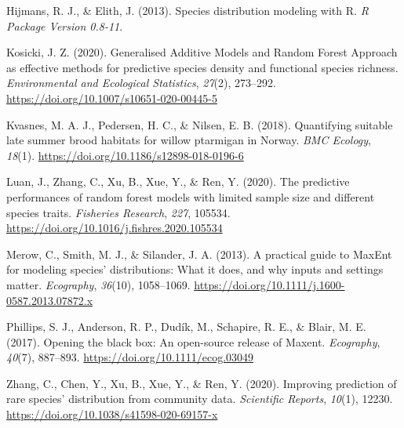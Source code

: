 \documentclass[
]{article}
\begin{document}
\leavevmode\hypertarget{ref-hijmansSpeciesDistributionModeling2013}{}%
Hijmans, R. J., \& Elith, J. (2013). Species distribution modeling with R. \emph{R Package Version 0.8-11}.

\leavevmode\hypertarget{ref-kosickiGeneralisedAdditiveModels2020}{}%
Kosicki, J. Z. (2020). Generalised Additive Models and Random Forest Approach as effective methods for predictive species density and functional species richness. \emph{Environmental and Ecological Statistics}, \emph{27}(2), 273--292. \url{https://doi.org/10.1007/s10651-020-00445-5}

\leavevmode\hypertarget{ref-kvasnesQuantifyingSuitableLate2018}{}%
Kvasnes, M. A. J., Pedersen, H. C., \& Nilsen, E. B. (2018). Quantifying suitable late summer brood habitats for willow ptarmigan in Norway. \emph{BMC Ecology}, \emph{18}(1). \url{https://doi.org/10.1186/s12898-018-0196-6}

\leavevmode\hypertarget{ref-luanPredictivePerformancesRandom2020}{}%
Luan, J., Zhang, C., Xu, B., Xue, Y., \& Ren, Y. (2020). The predictive performances of random forest models with limited sample size and different species traits. \emph{Fisheries Research}, \emph{227}, 105534. \url{https://doi.org/10.1016/j.fishres.2020.105534}

\leavevmode\hypertarget{ref-merowPracticalGuideMaxEnt2013}{}%
Merow, C., Smith, M. J., \& Silander, J. A. (2013). A practical guide to MaxEnt for modeling species' distributions: What it does, and why inputs and settings matter. \emph{Ecography}, \emph{36}(10), 1058--1069. \url{https://doi.org/10.1111/j.1600-0587.2013.07872.x}

\leavevmode\hypertarget{ref-phillipsOpeningBlackBox2017}{}%
Phillips, S. J., Anderson, R. P., Dudík, M., Schapire, R. E., \& Blair, M. E. (2017). Opening the black box: An open-source release of Maxent. \emph{Ecography}, \emph{40}(7), 887--893. \url{https://doi.org/10.1111/ecog.03049}

\leavevmode\hypertarget{ref-zhangImprovingPredictionRare2020}{}%
Zhang, C., Chen, Y., Xu, B., Xue, Y., \& Ren, Y. (2020). Improving prediction of rare species' distribution from community data. \emph{Scientific Reports}, \emph{10}(1), 12230. \url{https://doi.org/10.1038/s41598-020-69157-x}
\end{document}
